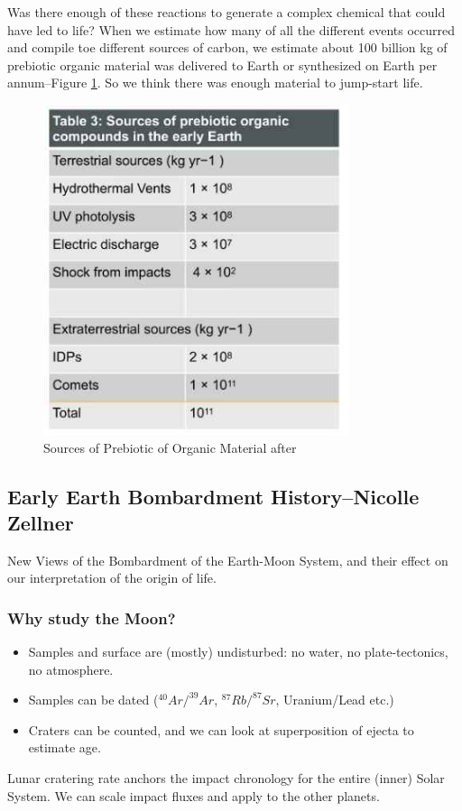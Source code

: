 \documentclass[]{article}
\begin{document}
Was there enough of these reactions to generate a complex chemical that could have led to life? When we estimate how many of all the different events occurred and compile toe different sources of carbon, we estimate about 100 billion kg of prebiotic organic material was delivered to Earth or synthesized on Earth per annum--Figure \ref{fig:SourcesPrebioticOrganicMaterial}. So we think there was enough material to jump-start life.

\begin{figure}[H]
	\begin{center}
		\caption[Sources of Prebiotic of Organic Material]{Sources of Prebiotic of Organic Material after \cite{chyba1997comets}} \label{fig:SourcesPrebioticOrganicMaterial}
		\includegraphics[width=0.8\textwidth]{SourcesPrebioticOrganicMaterial}
	\end{center}
\end{figure}


\subsection[Early Earth Bombardment History]{Early Earth Bombardment History--Nicolle Zellner }

New Views of the Bombardment of the Earth-Moon System, and their effect on our interpretation of the origin of life.

\subsubsection{Why study the Moon?}
\begin{itemize}
	\item Samples and surface are (mostly) undisturbed: no water, no plate-tectonics, no atmosphere.
	\item Samples can be dated ($^{40}Ar/^{39}Ar$, $^{87}Rb/^{87}Sr$, Uranium/Lead etc.)
	\item Craters can be counted, and we can look at superposition of ejecta to estimate age.
\end{itemize}
Lunar cratering rate anchors the impact chronology for the entire (inner) Solar System. We can scale impact fluxes and apply to the other planets.
\end{document}
